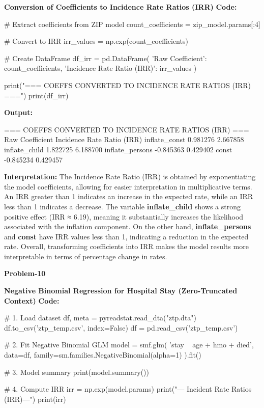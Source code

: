 \documentclass[12pt,a4paper]{article}
\begin{document}
\textbf{Conversion of Coefficients to Incidence Rate Ratios (IRR)}
\textbf{Code:}
\begin{codebox}
# Extract coefficients from ZIP model
count_coefficients = zip_model.params[:4]

# Convert to IRR
irr_values = np.exp(count_coefficients)

# Create DataFrame
df_irr = pd.DataFrame({
    'Raw Coefficient': count_coefficients,
    'Incidence Rate Ratio (IRR)': irr_values
})

print("=== COEFFS CONVERTED TO INCIDENCE RATE RATIOS (IRR) ===")
print(df_irr)
\end{codebox}

\textbf{Output:}
\begin{codebox}
=== COEFFS CONVERTED TO INCIDENCE RATE RATIOS (IRR) ===
Raw Coefficient Incidence Rate Ratio (IRR)
inflate_const 0.981276 2.667858
inflate_child 1.822725 6.188700
inflate_persons -0.845363 0.429402
const -0.845234 0.429457
\end{codebox}

\textbf{Interpretation:}
The Incidence Rate Ratio (IRR) is obtained by exponentiating the model coefficients, allowing for easier interpretation in multiplicative terms. An IRR greater than 1 indicates an increase in the expected rate, while an IRR less than 1 indicates a decrease.
The variable \textbf{inflate\_child} shows a strong positive effect (IRR ≈ 6.19), meaning it substantially increases the likelihood associated with the inflation component.
On the other hand, \textbf{inflate\_persons} and \textbf{const} have IRR values less than 1, indicating a reduction in the expected rate.
Overall, transforming coefficients into IRR makes the model results more interpretable in terms of percentage change in rates.

\begin{center}
\Large \textbf{Problem-10}
\end{center}
\textbf{Negative Binomial Regression for Hospital Stay (Zero-Truncated Context)}
\textbf{Code:}
\begin{codebox}
# 1. Load dataset
df, meta = pyreadstat.read_dta("ztp.dta")
df.to_csv('ztp_temp.csv', index=False)
df = pd.read_csv('ztp_temp.csv')

# 2. Fit Negative Binomial GLM
model = smf.glm(
    'stay ~ age + hmo + died',
    data=df,
    family=sm.families.NegativeBinomial(alpha=1)
).fit()

# 3. Model summary
print(model.summary())

# 4. Compute IRR
irr = np.exp(model.params)
print("\n--- Incident Rate Ratios (IRR)---")
print(irr)
\end{codebox}
\end{document}
